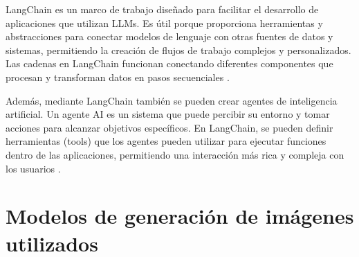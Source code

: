 LangChain es un marco de trabajo diseñado para facilitar el desarrollo de aplicaciones que utilizan LLMs. Es útil porque proporciona herramientas y abstracciones para conectar modelos de lenguaje con otras fuentes de datos y sistemas, permitiendo la creación de flujos de trabajo complejos y personalizados. Las cadenas en LangChain funcionan conectando diferentes componentes que procesan y transforman datos en pasos secuenciales \cite{langchain}.

Además, mediante LangChain también se pueden crear agentes de inteligencia artificial. Un agente AI es un sistema que puede percibir su entorno y tomar acciones para alcanzar objetivos específicos. En LangChain, se pueden definir herramientas (tools) que los agentes pueden utilizar para ejecutar funciones dentro de las aplicaciones, permitiendo una interacción más rica y compleja con los usuarios \cite{langchain}.

\section{Modelos de generación de imágenes utilizados}